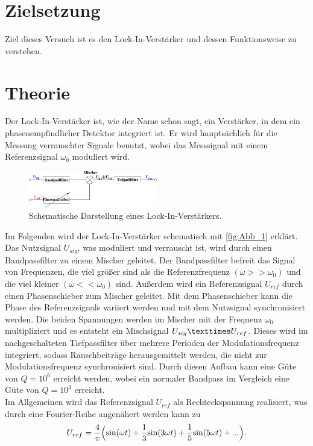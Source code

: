 \section{Zielsetzung}
\label{sec:Zielsetzung}
Ziel dieses Versuch ist es den Lock-In-Verstärker und dessen Funktionsweise zu verstehen.

\section{Theorie}
\label{sec:Theorie}
 Der Lock-In-Verstärker ist, wie der Name schon sagt, ein Verstärker, in dem ein phasenempfindlicher Detektor integriert ist.
 Er wird hauptsächlich für die Messung verrauschter Signale benutzt, wobei das Messsignal mit einem Referenzsignal $\omega_0$ moduliert wird.
 \begin{figure}[H]
    \centering
    \includegraphics[width=0.5\textwidth]{build/Abb_1.pdf}
    \caption {Schematische Darstellung eines Lock-In-Verstärkers.\cite[1]{V303}}
    \label{fig:Abb_1}
\end{figure}
Im Folgenden wird der Lock-In-Verstärker schematisch mit \autoref{fig:Abb_1} erklärt.
Das Nutzsignal $U_{sig}$, was moduliert und verrauscht ist, wird durch einen Bandpassfilter zu einem Mischer geleitet.
Der Bandpassfilter befreit das Signal von Frequenzen, die viel größer sind als die Referenzfrequenz $(\omega >> \omega_0)$ und die viel kleiner $(\omega << \omega_0)$ sind.
Außerdem wird ein Referenzsignal $U_{ref}$ durch einen Phasenschieber zum Mischer geleitet.
Mit dem Phasenschieber kann die Phase des Referenzsignals variiert werden und mit dem Nutzsignal synchronisiert werden.
Die beiden Spannungen werden im Mischer mit der Frequenz $\omega_0$ multipliziert und es entsteht ein Mischsignal $U_{sig} \texttimes U_{ref}$.
Dieses wird im nachgeschalteten Tiefpassfilter über mehrere Perioden der Modulationsfrequenz integriert, sodass Rauschbeiträge herausgemittelt werden, die nicht zur Modulationsfrequenz synchronisiert sind.
Durch diesen Aufbau kann eine Güte von $Q = 10^6$ erreicht werden, wobei ein normaler Bandpass im Vergleich eine Güte von $Q=10^3$ erreicht.\\
Im Allgemeinen wird das Referenzsignal $U_{ref}$ als Rechteckspannung realisiert, was durch eine Fourier-Reihe angenähert werden kann zu
\begin{equation}
    U_{ref} =\frac{4}{\pi}\Bigl( \text{sin}(\omega t) + \frac{1}{3}\text{sin}(3\omega t) + \frac{1}{5}\text{sin}(5\omega t) + ... \Bigr).
    \label{eqn:Referenzsignal}
\end{equation}
